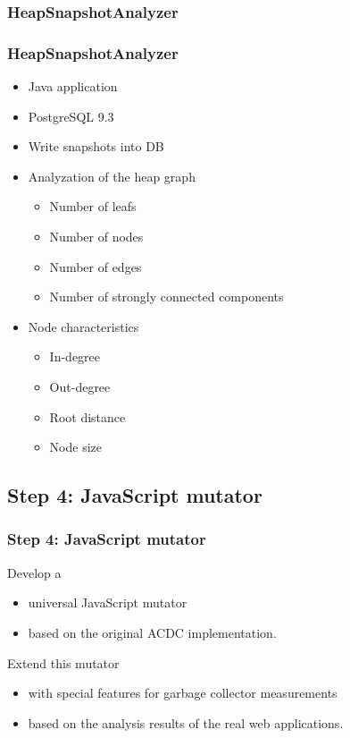 \documentclass{beamer}
\begin{document}
	\subsubsection{HeapSnapshotAnalyzer}
	\begin{frame}
		\frametitle{HeapSnapshotAnalyzer}
		\begin{itemize}
			\item Java application
			\item PostgreSQL 9.3
			\item Write snapshots into DB
			
			\pause
			
			\item Analyzation of the heap graph
			\begin{itemize}
				 \item Number of leafs
				 \item Number of nodes
				 \item Number of edges
				 \item Number of strongly connected components
			\end{itemize}
			
			\pause 
			
			\item Node characteristics
			\begin{itemize} 
				 \item In-degree
				 \item Out-degree
				 \item Root distance
				 \item Node size 
			\end{itemize}
		\end{itemize} 
	\end{frame}
	
	\subsection{Step 4: JavaScript mutator}
	\begin{frame}
		\frametitle{Step 4: JavaScript mutator}
		Develop a 
		\begin{itemize}
			\item universal JavaScript mutator
			\item based on the original ACDC implementation.
		\end{itemize}
		
		\pause
		
		Extend this mutator
		\begin{itemize}
			\item with special features for garbage collector measurements
			\item based on the analysis results of the real web applications.
		\end{itemize}
	\end{frame}
	
\end{document}
